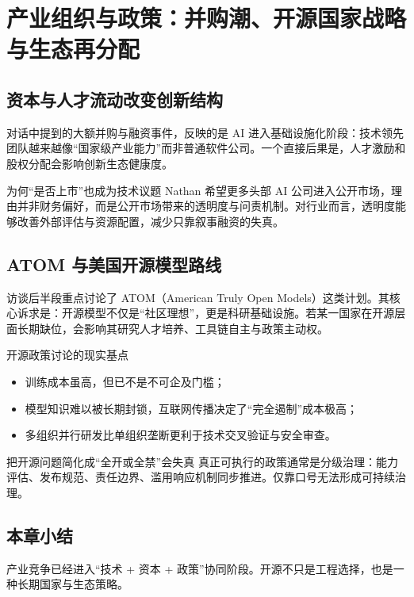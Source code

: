 \section{产业组织与政策：并购潮、开源国家战略与生态再分配}

\subsection{资本与人才流动改变创新结构}

对话中提到的大额并购与融资事件，反映的是 AI 进入基础设施化阶段：技术领先团队越来越像“国家级产业能力”而非普通软件公司。一个直接后果是，人才激励和股权分配会影响创新生态健康度。

\begin{knowledgebox}{为何“是否上市”也成为技术议题}
Nathan 希望更多头部 AI 公司进入公开市场，理由并非财务偏好，而是公开市场带来的透明度与问责机制。对行业而言，透明度能够改善外部评估与资源配置，减少只靠叙事融资的失真。
\end{knowledgebox}

\subsection{ATOM 与美国开源模型路线}

访谈后半段重点讨论了 ATOM（American Truly Open Models）这类计划。其核心诉求是：开源模型不仅是“社区理想”，更是科研基础设施。若某一国家在开源层面长期缺位，会影响其研究人才培养、工具链自主与政策主动权。

\begin{importantbox}{开源政策讨论的现实基点}
\begin{itemize}[leftmargin=1.5em]
    \item 训练成本虽高，但已不是不可企及门槛；
    \item 模型知识难以被长期封锁，互联网传播决定了“完全遏制”成本极高；
    \item 多组织并行研发比单组织垄断更利于技术交叉验证与安全审查。
\end{itemize}
\end{importantbox}

\begin{warningbox}{把开源问题简化成“全开或全禁”会失真}
真正可执行的政策通常是分级治理：能力评估、发布规范、责任边界、滥用响应机制同步推进。仅靠口号无法形成可持续治理。
\end{warningbox}

\subsection{本章小结}

产业竞争已经进入“技术 + 资本 + 政策”协同阶段。开源不只是工程选择，也是一种长期国家与生态策略。

